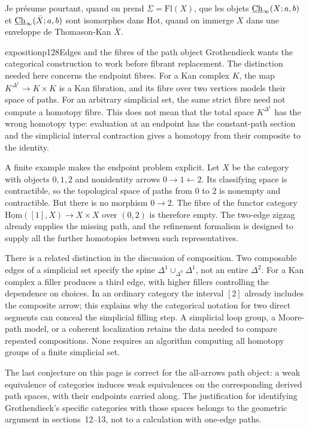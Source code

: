 Je présume pourtant, quand on prend $\Sigma=\mathrm{Fl}(X)$, que les objets $\underline{\mathrm{Ch}}_\infty(X;a,b)$ et $\underline{\mathrm{Ch}}_\infty(\bar{X};a,b)$ sont isomorphes dans Hot, quand on immerge $X$ dans une enveloppe de Thomason-Kan $\bar{X}$.

\clearpage
{}


\begin{dcomment}{exposition}{p128}{Edges and the fibres of the path object}
Grothendieck wants the categorical construction to work before fibrant replacement. The distinction needed here concerns the endpoint fibres. For a Kan complex $K$, the map $K^{\Delta^1}\to K\times K$ is a Kan fibration, and its fibre over two vertices models their space of paths. For an arbitrary simplicial set, the same strict fibre need not compute a homotopy fibre. This does not mean that the total space $K^{\Delta^1}$ has the wrong homotopy type: evaluation at an endpoint has the constant-path section and the simplicial interval contraction gives a homotopy from their composite to the identity.

A finite example makes the endpoint problem explicit. Let $X$ be the category with objects $0,1,2$ and nonidentity arrows $0\to1\leftarrow2$. Its classifying space is contractible, so the topological space of paths from $0$ to $2$ is nonempty and contractible. But there is no morphism $0\to2$. The fibre of the functor category $\underline{\mathrm{Hom}}([1],X)\to X\times X$ over $(0,2)$ is therefore empty. The two-edge zigzag already supplies the missing path, and the refinement formalism is designed to supply all the further homotopies between such representatives.

There is a related distinction in the discussion of composition. Two composable edges of a simplicial set specify the spine $\Delta^1\cup_{\Delta^0}\Delta^1$, not an entire $\Delta^2$. For a Kan complex a filler produces a third edge, with higher fillers controlling the dependence on choices. In an ordinary category the interval $[2]$ already includes the composite arrow; this explains why the categorical notation for two direct segments can conceal the simplicial filling step. A simplicial loop group, a Moore-path model, or a coherent localization retains the data needed to compare repeated compositions. None requires an algorithm computing all homotopy groups of a finite simplicial set.

The last conjecture on this page is correct for the all-arrows path object: a weak equivalence of categories induces weak equivalences on the corresponding derived path spaces, with their endpoints carried along. The justification for identifying Grothendieck's specific categories with those spaces belongs to the geometric argument in sections~12--13, not to a calculation with one-edge paths.
\end{dcomment}


